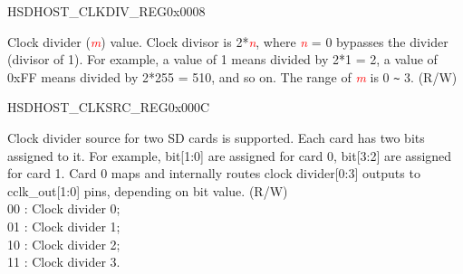 \begin{register}{H}{SDHOST\_CLKDIV\_REG}{0x{}0008}\label{regdesc:CLKDIVREG}
%
%
%
%
\regnewline%
\begin{regdesc}\begin{reglist}
\item [SDHOST\_CLK\_DIVIDER\textcolor{red}{\it{m}}]Clock divider (\textcolor{red}{\it{m}}) value. Clock divisor is 2*\textcolor{red}{\it{n}}, where \textcolor{red}{\it{n}} = 0 bypasses the divider (divisor of 1). For example, a value of 1 means divided by 2*1 = 2, a value of 0x{}FF means divided by 2*255 = 510, and so on. The range of \textcolor{red}{\it{m}} is 0 \verb+~+ 3. (R/W)
\end{reglist}\end{regdesc}
\end{register}

\begin{register}{H}{SDHOST\_CLKSRC\_REG}{0x{}000C}\label{regdesc:CLKSRCREG}
%
%
\regnewline%
\begin{regdesc}\begin{reglist}
\item [SDHOST\_CLKSRC\_REG]Clock divider source for two SD cards is supported. Each card has two bits assigned to it. For example, bit[1:0] are assigned for card 0, bit[3:2] are assigned for card 1. Card 0 maps and internally routes clock divider[0:3] outputs to cclk\_out[1:0] pins, depending on bit value. (R/W)\\
00 : Clock divider 0;\\
01 : Clock divider 1;\\
10 : Clock divider 2;\\
11 : Clock divider 3.
\end{reglist}\end{regdesc}
\end{register}


